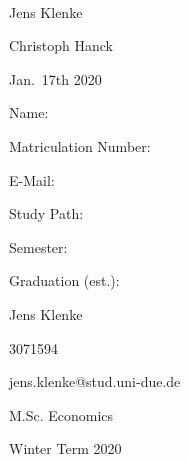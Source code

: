 \documentclass[12pt,a4paper]{article}
\begin{document}
\begin{titlepage}
\begin{center}
  \vspace{0.75cm}
  \large{}\\
  \vspace{0.5cm}
  Jens Klenke\\
  \end{center}
  \vfill
  \hrulefill

  \noindent\begin{minipage}[t]{0.3\textwidth}
  \end{minipage}
  \begin{minipage}[t]{0.7\textwidth}
  \hspace{1cm}Christoph Hanck
  \end{minipage}

  \noindent\begin{minipage}[t]{0.3\textwidth}
  \end{minipage}
  \begin{minipage}[t]{0.7\textwidth}
  \hspace{1cm}Jan.~17th 2020
  \end{minipage}

  \hrulefill

  \begin{multicols}{2}

  Name:

  Matriculation Number:

  E-Mail:

  Study Path:

  Semester:

  Graduation (est.):
 
  \columnbreak

  Jens Klenke

  3071594
  
  jens.klenke@stud.uni-due.de

  M.Sc. Economics


  Winter Term 2020

	\end{multicols}

\end{titlepage}



{
\hypersetup{linkcolor=black}

\setcounter{tocdepth}{3}
\tableofcontents
}
\end{document}

